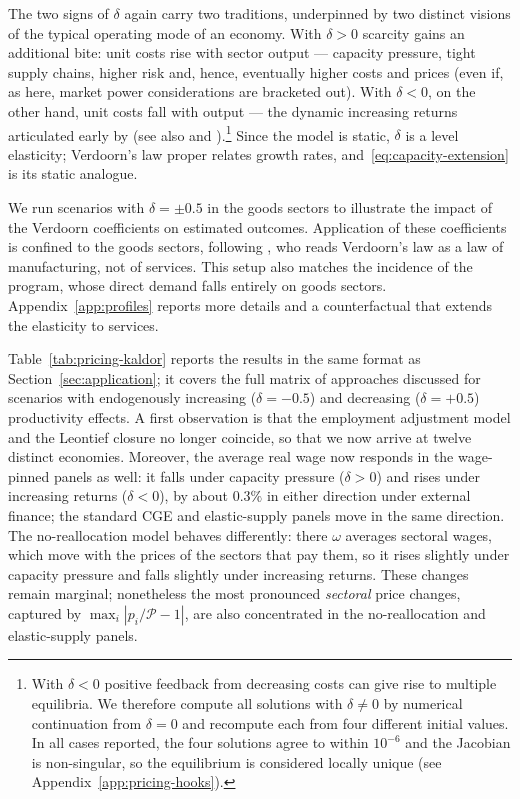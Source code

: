 The two signs of $\delta$ again carry two traditions, underpinned by two distinct visions of the typical operating mode of an economy. With $\delta > 0$ scarcity gains an additional bite: unit costs rise with sector output --- capacity pressure, tight supply chains, higher risk and, hence, eventually higher costs and prices (even if, as here, market power considerations are bracketed out). With $\delta < 0$, on the other hand, unit costs fall with output --- the dynamic increasing returns articulated early by \textcite{Verdoorn1949} (see also \citealp{Kaldor1966} and \citealp{SylosLabini1995}).\footnote{With $\delta < 0$ positive feedback from decreasing costs can give rise to multiple equilibria. We therefore compute all solutions with $\delta \neq 0$ by numerical continuation from $\delta = 0$ and recompute each from four different initial values. In all cases reported, the four solutions agree to within $10^{-6}$ and the Jacobian is non-singular, so the equilibrium is considered locally unique (see Appendix~\ref{app:pricing-hooks}).} Since the model is static, $\delta$ is a level elasticity; Verdoorn's law proper relates growth rates, and~\eqref{eq:capacity-extension} is its static analogue.

We run scenarios with $\delta = \pm 0.5$ in the goods sectors to illustrate the impact of the Verdoorn coefficients on estimated outcomes. Application of these coefficients is confined to the goods sectors, following \textcite{Kaldor1966}, who reads Verdoorn's law as a law of manufacturing, not of services. This setup also matches the incidence of the program, whose direct demand falls entirely on goods sectors. Appendix~\ref{app:profiles} reports more details and a counterfactual that extends the elasticity to services.

Table~\ref{tab:pricing-kaldor} reports the results in the same format as Section~\ref{sec:application}; it covers the full matrix of approaches discussed for scenarios with endogenously increasing ($\delta = -0.5$) and decreasing ($\delta = +0.5$) productivity effects. A first observation is that the employment adjustment model and the Leontief closure no longer coincide, so that we now arrive at twelve distinct economies. Moreover, the average real wage now responds in the wage-pinned panels as well: it falls under capacity pressure ($\delta > 0$) and rises under increasing returns ($\delta < 0$), by about $0.3\%$ in either direction under external finance; the standard CGE and elastic-supply panels move in the same direction. The no-reallocation model behaves differently: there $\omega$ averages sectoral wages, which move with the prices of the sectors that pay them, so it rises slightly under capacity pressure and falls slightly under increasing returns. These changes remain marginal; nonetheless the most pronounced \emph{sectoral} price changes, captured by $\max_i |p_i/\mathcal{P} - 1|$, are also concentrated in the no-reallocation and elastic-supply panels. 

